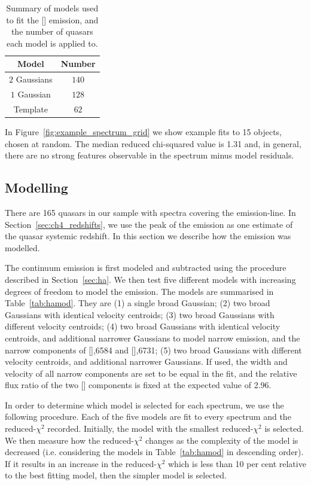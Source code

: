 \begin{table}
  \centering
  \footnotesize 
  \caption{Summary of models used to fit the [] emission, and the number of quasars each model is applied to.}
  \label{tab:oiiimod}
    \begin{tabular}{cc} 
    \hline
    Model & Number \\
    \hline
    $2$ Gaussians &  $140$ \\
    $1$ Gaussian  &  $128$ \\
    Template &  $62$ \\
    \hline
    \end{tabular}
\end{table} 

In Figure~\ref{fig:example_spectrum_grid} we show example fits to 15 objects, chosen at random. 
The median reduced chi-squared value is 1.31 and, in general, there are no strong features observable in the spectrum minus model residuals.

\subsection{Modelling \hans}
\label{sec:hamodel}

There are 165 quasars in our sample with spectra covering the \ha emission-line. 
In Section~\ref{sec:ch4_redshifts}, we use the peak of the \ha emission as one estimate of the quasar systemic redshift. 
In this section we describe how the \ha emission was modelled. 

The continuum emission is first modeled and subtracted using the procedure described in Section~\ref{sec:ha}. 
We then test five different models with increasing degrees of freedom to model the \ha emission. 
The models are summarised in Table~\ref{tab:hamod}. 
They are (1) a single broad Gaussian; (2) two broad Gaussians with identical velocity centroids; (3) two broad Gaussians with different velocity centroids; (4) two broad Gaussians with identical velocity centroids, and additional narrower Gaussians to model narrow \ha emission, and the narrow components of [],6584 and [],6731; (5) two broad Gaussians with different velocity centroids, and additional narrower Gaussians. 
If used, the width and velocity of all narrow components are set to be equal in the fit, and the relative flux ratio of the two [] components is fixed at the expected value of 2.96.

In order to determine which model is selected for each spectrum, we use the following procedure.  
Each of the five models are fit to every spectrum and the reduced-$\chi^2$ recorded.
Initially, the model with the smallest reduced-$\chi^2$ is selected. 
We then measure how the reduced-$\chi^2$ changes as the complexity of the model is decreased (i.e. considering the models in Table~\ref{tab:hamod} in descending order). 
If it results in an increase in the reduced-$\chi^2$ which is less than 10 per cent relative to the best fitting model, then the simpler model is selected.  

